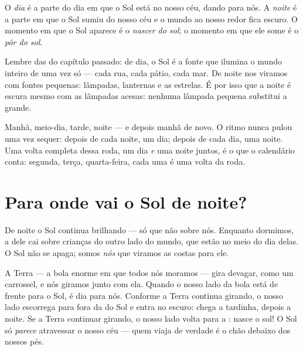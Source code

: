 \begin{definition}\label{def:g1:day-and-night:daynight}
O \emph{dia} é a parte do dia em que o Sol está no nosso
céu, dando  para nós. A \emph{noite} é a parte em que
o Sol sumiu do nosso céu e o mundo ao nosso redor fica escuro. O
momento em que o Sol aparece é o \emph{nascer do sol}; o momento em que ele some é o \emph{pôr do sol}.
\end{definition}

\begin{remark}\label{rem:g1:day-and-night:lamp}
Lembre das  do capítulo passado: de dia, o Sol é a fonte
que ilumina o mundo inteiro de uma vez só --- cada rua, cada pátio,
cada mar. De noite nos viramos com fontes pequenas: lâmpadas,
lanternas e as estrelas. É por isso que a noite é escura mesmo com as
lâmpadas acesas: nenhuma lâmpada pequena substitui a grande.
\end{remark}

\begin{example}\label{ex:g1:day-and-night:rhythm}
Manhã, meio-dia, tarde, noite --- e depois manhã de novo. O ritmo
nunca pulou uma vez sequer: depois de cada noite, um dia; depois de
cada dia, uma noite. Uma volta completa dessa roda, um dia \emph{e}
uma noite juntos, é o que o calendário conta: segunda, terça,
quarta-feira, cada uma é uma volta da roda.
\end{example}

\section{Para onde vai o Sol de noite?}

De noite o Sol continua brilhando --- só que não sobre nós. Enquanto
dormimos, a  dele cai sobre crianças do outro lado do mundo, que
estão no meio do dia delas. O Sol não se apaga; somos \emph{nós} que
viramos as costas para ele.

\begin{example}\label{ex:g1:day-and-night:spinning}
A Terra --- a bola enorme em que todos nós moramos --- gira devagar,
como um carrossel, e nós giramos junto com ela. Quando o nosso lado
da bola está de frente para o Sol, é dia para nós. Conforme a Terra
continua girando, o nosso lado escorrega para fora da  do Sol e
entra no escuro: chega a tardinha, depois a noite. Se a Terra
continuar girando, o nosso lado volta para a : nasce o sol! O Sol
só \emph{parece} atravessar o nosso céu --- quem viaja de verdade é o
chão debaixo dos nossos pés.
\end{example}

